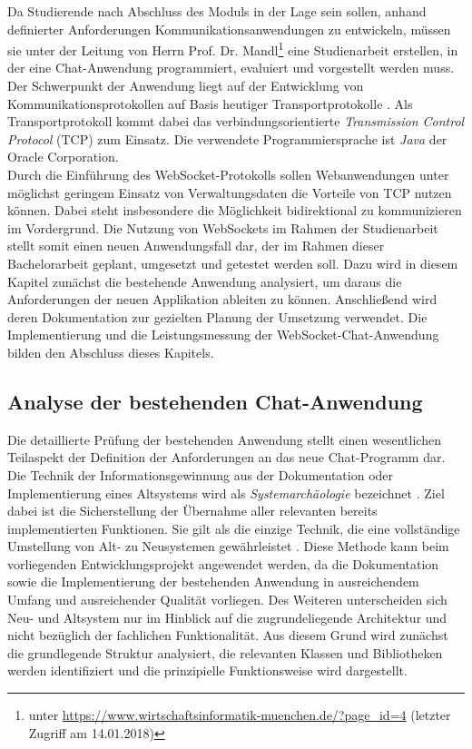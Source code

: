 \documentclass[11pt,a4paper,titlepage]{scrartcl}
\numberwithin{equation}{section}
\begin{document}
\noindent Da Studierende nach Abschluss des Moduls in der Lage sein sollen, anhand definierter Anforderungen Kommunikationsanwendungen zu entwickeln, müssen sie unter der Leitung von Herrn Prof. Dr. Mandl\footnote{unter \url{https://www.wirtschaftsinformatik-muenchen.de/?page\_id=4} (letzter Zugriff am 14.01.2018)} eine Studienarbeit erstellen, in der eine Chat-Anwendung programmiert, evaluiert und vorgestellt werden muss. Der Schwerpunkt der Anwendung liegt auf der Entwicklung von Kommunikationsprotokollen auf Basis heutiger Transportprotokolle \autocite{mandl_datenkommunikation_2017}. Als Transportprotokoll kommt dabei das verbindungsorientierte \textit{Transmission Control Protocol} (TCP) zum Einsatz. Die verwendete Programmiersprache ist \textit{Java} der Oracle Corporation.\\

\noindent Durch die Einführung des WebSocket-Protokolls sollen Webanwendungen unter möglichst geringem Einsatz von Verwaltungsdaten die Vorteile von TCP nutzen können. Dabei steht insbesondere die Möglichkeit bidirektional zu kommunizieren im Vordergrund. Die Nutzung von WebSockets im Rahmen der Studienarbeit stellt somit einen neuen Anwendungsfall dar, der im Rahmen dieser Bachelorarbeit geplant, umgesetzt und getestet werden soll. Dazu wird in diesem Kapitel zunächst die bestehende Anwendung analysiert, um daraus die Anforderungen der neuen Applikation ableiten zu können. Anschließend wird deren Dokumentation zur gezielten Planung der Umsetzung verwendet. Die Implementierung und die Leistungsmessung der WebSocket-Chat-Anwendung bilden den Abschluss dieses Kapitels. 

\subsection{Analyse der bestehenden Chat-Anwendung}
Die detaillierte Prüfung der bestehenden Anwendung stellt einen wesentlichen Teilaspekt der Definition der Anforderungen an das neue Chat-Programm dar. Die Technik der Informationsgewinnung aus der Dokumentation oder Implementierung eines Altsystems wird als \textit{Systemarchäologie} bezeichnet \autocite[38]{pohl_basiswissen_2009}. Ziel dabei ist die Sicherstellung der Übernahme aller relevanten bereits implementierten Funktionen. Sie gilt als die einzige Technik, die eine vollständige Umstellung von Alt- zu Neusystemen gewährleistet \autocite[38]{pohl_basiswissen_2009}. Diese Methode kann beim vorliegenden Entwicklungsprojekt angewendet werden, da die Dokumentation sowie die Implementierung der bestehenden Anwendung in ausreichendem Umfang und ausreichender Qualität vorliegen. Des Weiteren unterscheiden sich Neu- und Altsystem nur im Hinblick auf die zugrundeliegende Architektur und nicht bezüglich der fachlichen Funktionalität. Aus diesem Grund wird zunächst die grundlegende Struktur analysiert, die relevanten Klassen und Bibliotheken werden identifiziert und die prinzipielle Funktionsweise wird dargestellt.
\end{document}
